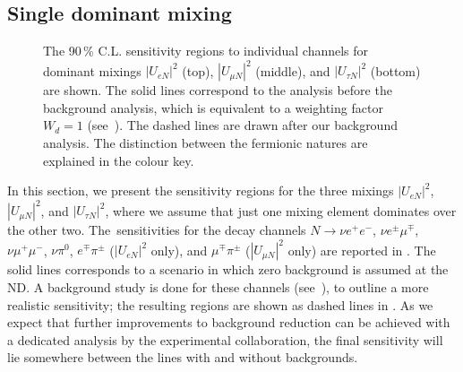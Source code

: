 \subsection{Single dominant mixing}
\label{sec:dominant}

\begin{figure}
	\centering
	{\resizebox{\linewidth}{!}{}}
	\vspace{0.05em}

	{\resizebox{\linewidth}{!}{}}
	\vspace{0.05em}

	{\resizebox{\linewidth}{!}{}}

	\caption{The 90\,\% C.L. sensitivity regions to individual channels for dominant mixings %
		$|U_{e N}|^2$ (top), $|U_{\mu N}|^2$ (middle), and $|U_{\tau N}|^2$ (bottom) are shown.
		The solid lines correspond to the analysis before the background analysis, which is equivalent %
		to a weighting factor $W_d = 1$ (see~).
		The dashed lines are drawn after our background analysis.
		The distinction between the fermionic natures are explained in the colour key.}
	\label{fig:senseW}
\end{figure}

In this section, we present the sensitivity regions for the three mixings $|U_{e N}|^2$, $|U_{\mu N}|^2$, and %
$|U_{\tau N}|^2$, where we assume that just one mixing element dominates over the other two.
The~sensitivities for the decay channels $N\to\nu e^+ e^-$, $\nu e^\pm \mu^\mp$, $\nu \mu^+ \mu^-$, $\nu \pi^0$, %
$e^\mp \pi^\pm$ ($|U_{e N}|^2$ only), and $\mu^\mp \pi^\pm$ ($|U_{\mu N}|^2$ only) are reported in .
The solid lines corresponds to a scenario in which zero background is assumed at the ND.
A background study is done for these channels (see~), to outline a more realistic sensitivity; %
the resulting regions are shown as dashed lines in .
As we expect that further improvements to background reduction can be achieved %
with a dedicated analysis by the experimental collaboration, %
the final sensitivity will lie somewhere between the lines with and without backgrounds.

